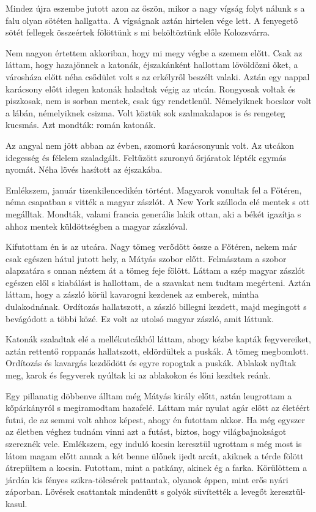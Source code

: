 \documentclass{IEEEtran}
\begin{document}
Mindez újra eszembe jutott azon az őszön, mikor a nagy vígság folyt nálunk s a falu olyan sötéten hallgatta. A vígságnak aztán hirtelen vége lett. A fenyegető sötét fellegek összeértek fölöttünk s mi beköltöztünk előle Kolozsvárra.

Nem nagyon értettem akkoriban, hogy mi megy végbe a szemem előtt. Csak az láttam, hogy hazajönnek a katonák, éjszakánként hallottam lövöldözni őket, a városháza előtt néha csődület volt s az erkélyről beszélt valaki. Aztán egy nappal karácsony előtt idegen katonák haladtak végig az utcán. Rongyosak voltak és piszkosak, nem is sorban mentek, csak úgy rendetlenül. Némelyiknek bocskor volt a lábán, némelyiknek csizma. Volt köztük sok szalmakalapos is és rengeteg kucsmás. Azt mondták: román katonák.

Az angyal nem jött abban az évben, szomorú karácsonyunk volt. Az utcákon idegesség és félelem szaladgált. Feltűzött szuronyú őrjáratok lépték egymás nyomát. Néha lövés hasított az éjszakába.

Emlékszem, január tizenkilencedikén történt. Magyarok vonultak fel a Főtéren, néma csapatban s vitték a magyar zászlót. A New York szálloda elé mentek s ott megálltak. Mondták, valami francia generális lakik ottan, aki a békét igazítja s ahhoz mentek küldöttségben a magyar zászlóval.

Kifutottam én is az utcára. Nagy tömeg verődött össze a Főtéren, nekem már csak egészen hátul jutott hely, a Mátyás szobor előtt. Felmásztam a szobor alapzatára s onnan néztem át a tömeg feje fölött. Láttam a szép magyar zászlót egészen elől s kiabálást is hallottam, de a szavakat nem tudtam megérteni. Aztán láttam, hogy a zászló körül kavarogni kezdenek az emberek, mintha dulakodnának. Ordítozás hallatszott, a zászló billegni kezdett, majd megingott s bevágódott a többi közé. Ez volt az utolsó magyar zászló, amit láttunk.

Katonák szaladtak elé a mellékutcákból láttam, ahogy kézbe kapták fegyvereiket, aztán rettentő roppanás hallatszott, eldördültek a puskák. A tömeg megbomlott. Ordítozás és kavargás kezdődött és egyre ropogtak a puskák. Ablakok nyíltak meg, karok és fegyverek nyúltak ki az ablakokon és lőni kezdtek reánk.

Egy pillanatig döbbenve álltam még Mátyás király előtt, aztán leugrottam a kőpárkányról s megiramodtam hazafelé. Láttam már nyulat agár előtt az életéért futni, de az semmi volt ahhoz képest, ahogy én futottam akkor. Ha még egyszer az életben véghez tudnám vinni azt a futást, biztos, hogy világbajnokságot szereznék vele. Emlékszem, egy induló kocsin keresztül ugrottam s még most is látom magam előtt annak a két benne ülőnek ijedt arcát, akiknek a térde fölött átrepültem a kocsin. Futottam, mint a patkány, akinek ég a farka. Körülöttem a járdán kis fényes szikra-tölcsérek pattantak, olyanok éppen, mint erős nyári záporban. Lövések csattantak mindenütt s golyók süvítették a levegőt keresztül-kasul.
\end{document}

